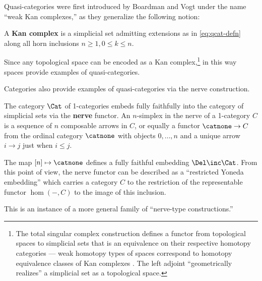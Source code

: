   Quasi-categories were first introduced by Boardman and Vogt \cite{BoardmanVogt:1973hi} under the name ``weak Kan complexes,'' as they generalize the following notion:

  \begin{definition}\label{defn:kan-complex}
    \leanok
  A \textbf{Kan complex} is a simplicial set admitting extensions as in \eqref{eq:qcat-defn} along all horn inclusions $n \geq 1, 0 \leq k \leq n$.
  \end{definition}

Since any topological space can be encoded as a Kan complex,\footnote{The total singular complex construction defines a functor from topological spaces to simplicial sets that is an equivalence on their respective homotopy categories --- weak homotopy types of spaces correspond to homotopy equivalence classes of Kan complexes \cite[\S II.2]{Quillen:1967ha}. The left adjoint %
    ``geometrically realizes'' a simplicial set as a topological space.}
in this way spaces provide examples of quasi-categories.

Categories also provide examples of quasi-categories via the nerve construction.

\begin{definition}[nerve]\label{defn:nerve}
  \leanok
  The category $\Cat$ of 1-categories embeds fully faithfully into the category of simplicial sets via the \textbf{nerve} functor. An $n$-simplex in the nerve of a 1-category $C$ is a sequence of $n$ composable arrows in $C$, or equally a functor $\catnone \to C$ from the ordinal category $\catnone$ with objects $0,\ldots, n$ and a unique arrow $i \to j$ just when $i \leq j$.
\end{definition}


\begin{definition}\label{defn:nerve-functor}
  \leanok
 The map $[n] \mapsto \catnone$ defines a fully faithful embedding $\Del\inc\Cat$. From this point of view, the nerve functor can be described as a ``restricted Yoneda embedding'' which carries a category $C$ to the restriction of the representable functor $\hom(-,C)$ to the image of this inclusion.
\end{definition}

 This is an instance of a more general family of ``nerve-type constructions.'' %

